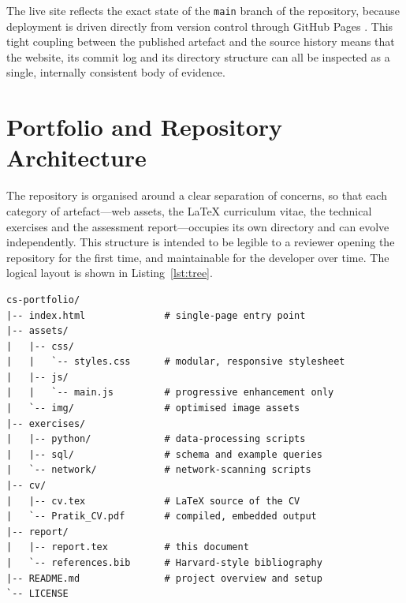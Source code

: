 \documentclass[11pt,a4paper]{article}
\begin{document}
\vspace{4pt}
\noindent{}
\vspace{4pt}

The live site reflects the exact state of the \texttt{main} branch of the repository, because deployment is driven directly from version control through GitHub Pages \citep{github2024}. This tight coupling between the published artefact and the source history means that the website, its commit log and its directory structure can all be inspected as a single, internally consistent body of evidence.

\section{Portfolio and Repository Architecture}
The repository is organised around a clear separation of concerns, so that each category of artefact---web assets, the \LaTeX{} curriculum vitae, the technical exercises and the assessment report---occupies its own directory and can evolve independently. This structure is intended to be legible to a reviewer opening the repository for the first time, and maintainable for the developer over time. The logical layout is shown in Listing~\ref{lst:tree}.

\begin{lstlisting}[style=tree,caption={Repository directory structure.},label={lst:tree}]
cs-portfolio/
|-- index.html              # single-page entry point
|-- assets/
|   |-- css/
|   |   `-- styles.css      # modular, responsive stylesheet
|   |-- js/
|   |   `-- main.js         # progressive enhancement only
|   `-- img/                # optimised image assets
|-- exercises/
|   |-- python/             # data-processing scripts
|   |-- sql/                # schema and example queries
|   `-- network/            # network-scanning scripts
|-- cv/
|   |-- cv.tex              # LaTeX source of the CV
|   `-- Pratik_CV.pdf       # compiled, embedded output
|-- report/
|   |-- report.tex          # this document
|   `-- references.bib      # Harvard-style bibliography
|-- README.md               # project overview and setup
`-- LICENSE
\end{lstlisting}
\end{document}
